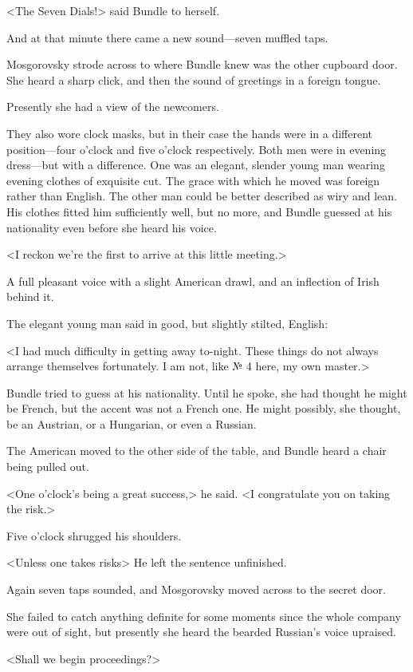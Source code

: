 <The Seven Dials!> said Bundle to herself.

And at that minute there came a new sound—seven muffled taps.

Mosgorovsky strode across to where Bundle knew was the other cupboard door. She heard a sharp click, and then the sound of greetings in a foreign tongue.

Presently she had a view of the newcomers.

They also wore clock masks, but in their case the hands were in a different position—four o'clock and five o'clock respectively. Both men were in evening dress—but with a difference. One was an elegant, slender young man wearing evening clothes of exquisite cut. The grace with which he moved was foreign rather than English. The other man could be better described as wiry and lean. His clothes fitted him sufficiently well, but no more, and Bundle guessed at his nationality even before she heard his voice.

<I reckon we're the first to arrive at this little meeting.>

A full pleasant voice with a slight American drawl, and an inflection of Irish behind it.

The elegant young man said in good, but slightly stilted, English:

<I had much difficulty in getting away to-night. These things do not always arrange themselves fortunately. I am not, like № 4 here, my own master.>

Bundle tried to guess at his nationality. Until he spoke, she had thought he might be French, but the accent was not a French one. He might possibly, she thought, be an Austrian, or a Hungarian, or even a Russian.

The American moved to the other side of the table, and Bundle heard a chair being pulled out.

<One o'clock's being a great success,> he said. <I congratulate you on taking the risk.>

Five o'clock shrugged his shoulders.

<Unless one takes risks\longdash> He left the sentence unfinished.

Again seven taps sounded, and Mosgorovsky moved across to the secret door.

She failed to catch anything definite for some moments since the whole company were out of sight, but presently she heard the bearded Russian's voice upraised.

<Shall we begin proceedings?>


